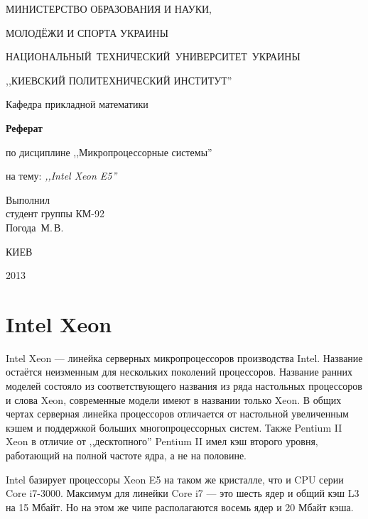 \documentclass[a4paper,12pt,notitlepage,headsepline,pdftex]{scrartcl}
\begin{document}
\begin{titlepage}
  \begin{center}
    \large
    \MakeUppercase{Министерство образования и науки,}

    \MakeUppercase{молодёжи и спорта Украины}

    \mbox{\MakeUppercase{Национальный технический университет Украины}}

    \MakeUppercase{,,Киевский политехнический институт''}

    \addvspace{6pt}

    \normalsize
    Кафедра прикладной математики

    \vfill

    \textbf{Реферат}

    по дисциплине ,,Микропроцессорные системы''

    на тему: \textit{,,Intel Xeon E5''}
  \end{center}

  \vfill

  \noindent
  Выполнил\\
  студент группы КМ-92\\
  Погода~М.\,В.\\
  \vfill

  \begin{center}
    КИЕВ

    2013
  \end{center}
\end{titlepage}

\section{Intel Xeon}
Intel Xeon --- линейка серверных микропроцессоров производства Intel.
Название остаётся неизменным для нескольких поколений процессоров.
Название ранних моделей состояло из соответствующего названия из ряда
настольных процессоров и слова Xeon, современные модели имеют в названии
только Xeon.
В общих чертах серверная линейка процессоров отличается от настольной
увеличенным кэшем и поддержкой больших многопроцессорных систем.
Также Pentium II Xeon в отличие от ,,десктопного'' Pentium II имел кэш второго
уровня, работающий на полной частоте ядра, а не на половине.

Intel базирует процессоры Xeon E5 на таком же кристалле, что и CPU серии Core
i7-3000.
Максимум для линейки Core i7 --- это шесть ядер и общий кэш L3 на 15 Мбайт.
Но на этом же чипе располагаются восемь ядер и 20 Мбайт кэша.
\end{document}
